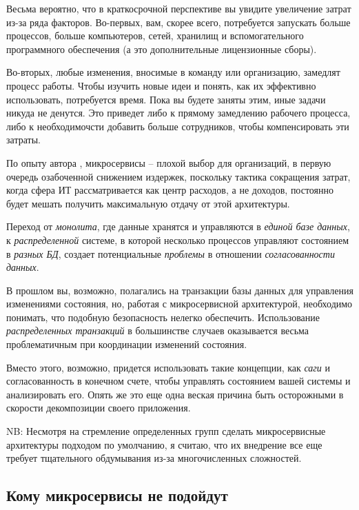 \documentclass[%
	11pt,
	a4paper,
	utf8,
		]{article}
\begin{document}
Весьма вероятно, что в краткосрочной перспективе вы увидите увеличение затрат из-за ряда факторов. Во-первых, вам, скорее всего, потребуется запускать больше процессов, больше компьютеров, сетей, хранилищ и вспомогательного программного обеспечения (а это дополнительные лицензионные сборы).

Во-вторых, любые изменения, вносимые в команду или организацию, замедлят процесс работы. Чтобы изучить новые идеи и понять, как их эффективно использовать, потребуется время. Пока вы будете заняты этим, иные задачи никуда не денутся. Это приведет либо к прямому замедлению рабочего процесса, либо к необходимочсти добавить больше сотрудников, чтобы компенсировать эти затраты.

По опыту автора \cite[]{microservices-2024}, микросервисы -- плохой выбор для организаций, в первую очередь озабоченной снижением издержек, поскольку тактика сокращения затрат, когда сфера ИТ рассматривается как центр расходов, а не доходов, постоянно будет мешать получить максимальную отдачу от этой архитектуры.

Переход от \emph{монолита}, где данные хранятся и управляются в \emph{единой базе данных}, к \emph{распределенной} системе, в которой несколько процессов управляют состоянием в \emph{разных БД}, создает потенциальные \emph{проблемы} в отношении \emph{согласованности данных}.

В прошлом вы, возможно, полагались на транзакции базы данных для управления изменениями состояния, но, работая с микросервисной архитектурой, необходимо понимать, что подобную безопасность нелегко обеспечить. Использование \emph{распределенных транзакций} в большинстве случаев оказывается весьма проблематичным при координации изменений состояния.

Вместо этого, возможно, придется использовать такие концепции, как \emph{саги} и согласованность в конечном счете, чтобы управлять состоянием вашей системы и анализировать его. Опять же это еще одна веская причина быть осторожными в скорости декомпозиции своего приложения.

NB: Несмотря на стремление определенных групп сделать микросервисные архитектуры подходом по умолчанию, я считаю, что их внедрение все еще требует тщательного обдумывания из-за многочисленных сложностей. 

\subsection{Кому микросервисы не подойдут}
\end{document}
